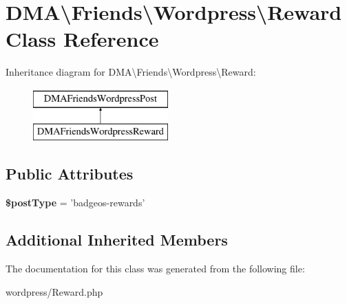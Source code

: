 \hypertarget{classDMA_1_1Friends_1_1Wordpress_1_1Reward}{\section{D\-M\-A\textbackslash{}Friends\textbackslash{}Wordpress\textbackslash{}Reward Class Reference}
\label{classDMA_1_1Friends_1_1Wordpress_1_1Reward}
}
Inheritance diagram for D\-M\-A\textbackslash{}Friends\textbackslash{}Wordpress\textbackslash{}Reward\-:\begin{figure}[H]
\begin{center}
\leavevmode
\includegraphics[height=2.000000cm]{d6/d94/classDMA_1_1Friends_1_1Wordpress_1_1Reward}
\end{center}
\end{figure}
\subsection*{Public Attributes}
\begin{DoxyCompactItemize}
\item 
\hypertarget{classDMA_1_1Friends_1_1Wordpress_1_1Reward_a653920c3f524beabf1ab4350ae09df69}{{\bfseries \$post\-Type} = 'badgeos-\/rewards'}\label{classDMA_1_1Friends_1_1Wordpress_1_1Reward_a653920c3f524beabf1ab4350ae09df69}

\end{DoxyCompactItemize}
\subsection*{Additional Inherited Members}


The documentation for this class was generated from the following file\-:\begin{DoxyCompactItemize}
\item 
wordpress/Reward.\-php\end{DoxyCompactItemize}
